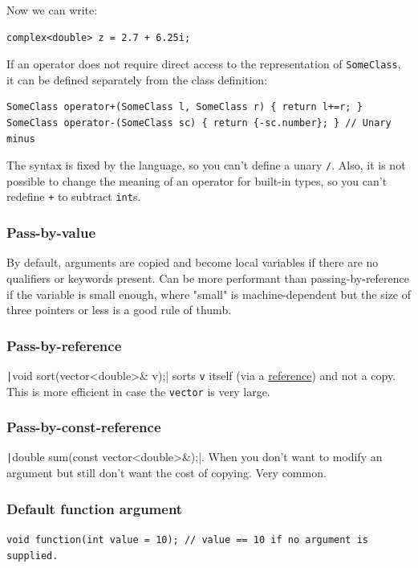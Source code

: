 \documentclass[table, xcdraw]{article}%
\begin{document}
Now we can write:

\begin{verbatim}
complex<double> z = 2.7 + 6.25i;
\end{verbatim}

If an operator does not require direct access to the representation of \texttt{SomeClass}, it can be defined separately from the class definition:

\begin{verbatim}
SomeClass operator+(SomeClass l, SomeClass r) { return l+=r; }
SomeClass operator-(SomeClass sc) { return {-sc.number}; } // Unary minus
\end{verbatim}

The syntax is fixed by the language, so you can’t define a unary \texttt{/}.  Also, it is not possible to change the meaning of an operator for built-in types, so you can’t redefine \texttt{+} to subtract \texttt{int}s.

\subsubsection{Pass-by-value}
By default, arguments are copied and become local variables if there are no qualifiers or keywords present. Can be more performant than passing-by-reference if the variable is small enough, where "small" is machine-dependent but the size of three pointers or less is a good rule of thumb.

\subsubsection{Pass-by-reference}

\texttt|void sort(vector<double>& v);| sorts \texttt{v} itself (via a \hyperref[reference]{reference}) and not a copy. This is more efficient in case the \texttt{vector} is very large.

\subsubsection{Pass-by-const-reference}

\texttt|double sum(const vector<double>&);|. When you don't want to modify an argument but still don't want the cost of copying. Very common.

\subsubsection{Default function argument}
\texttt{void function(int value = 10); // value == 10 if no argument is supplied.}
\end{document}
